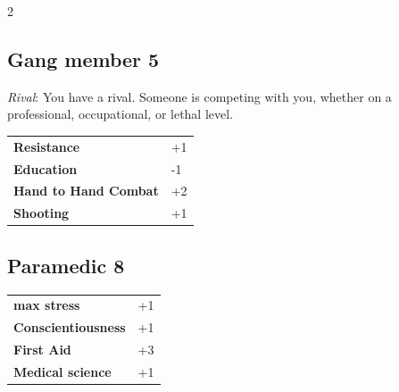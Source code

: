 \begin{multicols}{2}
\begin{tcolorbox}

\end{tcolorbox}

\begin{tcolorbox}
    \subsection*{Gang member \hfill \small{5 }}
    \tcblower
\textit{Rival}: You have a rival. Someone is competing with you, whether on a professional, occupational, or lethal level.


\vspace{3mm}

\begin{tabular}{@{}ll@{}}
    \textbf{Resistance} & +1\\
    \textbf{Education} & -1\\
    \textbf{Hand to Hand Combat} & +2\\
    \textbf{Shooting} & +1\\
\end{tabular}


\end{tcolorbox}

\begin{tcolorbox}
    \subsection*{Paramedic \hfill \small{8 }}
    \tcblower




\begin{tabular}{@{}ll@{}}
    \textbf{max stress} & +1\\
    \textbf{Conscientiousness} & +1\\
    \textbf{First Aid} & +3\\
    \textbf{Medical science} & +1\\
\end{tabular}


\end{tcolorbox}
\end{multicols}
